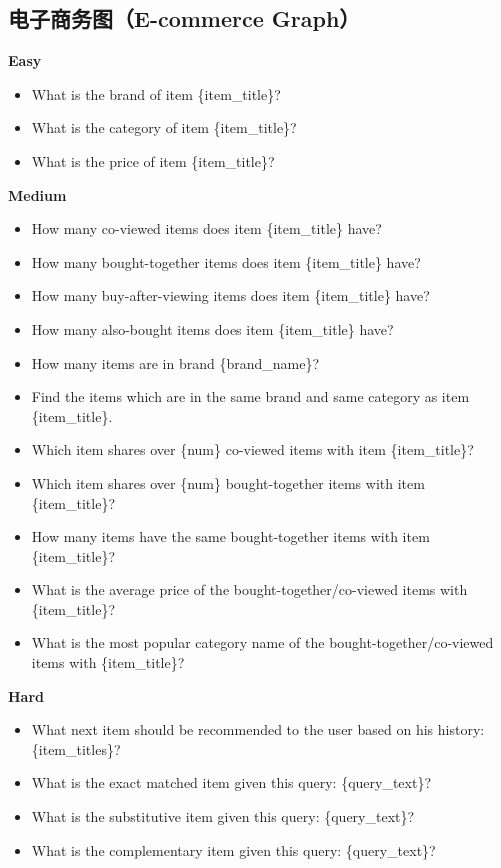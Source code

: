 \documentclass[11pt,UTF8,fontset=fandol]{ctexart}
\begin{document}
\subsection*{电子商务图（E-commerce Graph）}
\noindent\textbf{Easy}
\begin{itemize}[leftmargin=1.4em,nosep]
\item What is the brand of item \{item\_title\}?
\item What is the category of item \{item\_title\}?
\item What is the price of item \{item\_title\}?
\end{itemize}
\noindent\textbf{Medium}
\begin{itemize}[leftmargin=1.4em,nosep]
\item How many co-viewed items does item \{item\_title\} have?
\item How many bought-together items does item \{item\_title\} have?
\item How many buy-after-viewing items does item \{item\_title\} have?
\item How many also-bought items does item \{item\_title\} have?
\item How many items are in brand \{brand\_name\}?
\item Find the items which are in the same brand and same category as item \{item\_title\}.
\item Which item shares over \{num\} co-viewed items with item \{item\_title\}?
\item Which item shares over \{num\} bought-together items with item \{item\_title\}?
\item How many items have the same bought-together items with item \{item\_title\}?
\item What is the average price of the bought-together/co-viewed items with \{item\_title\}?
\item What is the most popular category name of the bought-together/co-viewed items with \{item\_title\}?
\end{itemize}
\noindent\textbf{Hard}
\begin{itemize}[leftmargin=1.4em,nosep]
\item What next item should be recommended to the user based on his history: \{item\_titles\}?
\item What is the exact matched item given this query: \{query\_text\}?
\item What is the substitutive item given this query: \{query\_text\}?
\item What is the complementary item given this query: \{query\_text\}?
\end{itemize}
\end{document}
